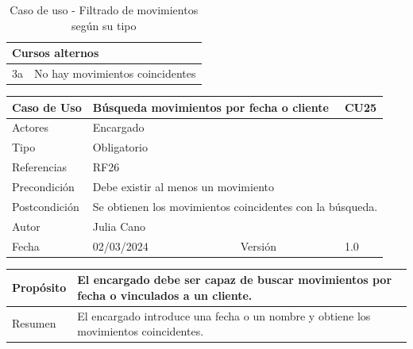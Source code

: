 \begin{table}[H]
	\centering
	\begin{tabular}{| m{} | m{} | m{} | m{} |}
		\hline
		\multicolumn{4}{|m{0.9\textwidth}|}{Cursos alternos}     \\ 
		\hline
		3a & \multicolumn{3}{m{0.67\textwidth}|}{No hay movimientos coincidentes} \\ 
		\hline
	\end{tabular}
	\caption{Caso de uso - Filtrado de movimientos según su tipo}
\end{table}

\newpage


\begin{table}[H]
	\centering
	\begin{tabular}{| m{} | m{} | m{} | m{}|}
		\hline
		\rowcolor{grayshade} Caso de Uso & \multicolumn{2}{|m{0.43\textwidth}|}{Búsqueda movimientos por fecha o cliente} &  CU25\\ 
		\hline
		Actores & \multicolumn{3}{l|}{Encargado} \\ 
		\hline
		Tipo & \multicolumn{3}{l|}{Obligatorio} \\ 
		\hline
		Referencias & \multicolumn{3}{l|}{RF26} \\ 
		\hline
		Precondición & \multicolumn{3}{m{0.67\textwidth}|}{Debe existir al menos un movimiento} \\ 
		\hline
		Postcondición & \multicolumn{3}{m{0.67\textwidth}|}{Se obtienen los movimientos coincidentes con la búsqueda.} \\ 
		\hline
		Autor & \multicolumn{3}{l|}{Julia Cano} \\ 
		\hline
		Fecha & 02/03/2024 & Versión & 1.0 \\
		\hline
	\end{tabular}
\end{table}

\begin{table}[H]
	\centering
	\begin{tabular}{| m{} | m{} | m{} | m{} |}
		\hline
		Propósito & \multicolumn{3}{m{0.67\textwidth}|}{El encargado debe ser capaz de buscar movimientos por fecha o vinculados a un cliente.}  \\ 
		\hline
		Resumen & \multicolumn{3}{m{0.67\textwidth}|}{El encargado introduce una fecha o un nombre y obtiene los movimientos coincidentes.} \\ 
		\hline
	\end{tabular}
\end{table}


